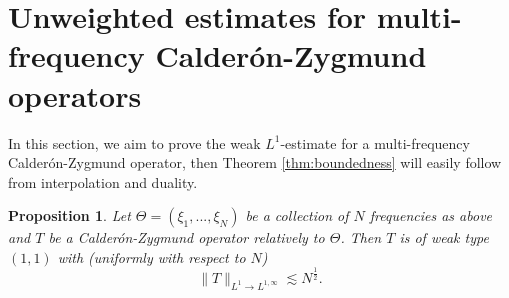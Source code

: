 \documentclass[11pt]{amsart}
\newtheorem{proposition}[theorem]{Proposition}
\theoremstyle{remark}
\begin{document}
\section{Unweighted estimates for multi-frequency Calder\'on-Zygmund operators} \label{sec1}

In this section, we aim to prove the weak $L^1$-estimate for a multi-frequency Calder\'on-Zygmund operator, then Theorem \ref{thm:boundedness} will easily follow from interpolation and duality.

\begin{proposition} \label{prop:bound} Let $\Theta=(\xi_1,...,\xi_N)$ be a collection of $N$ frequencies as above and $T$ be a Calder\'on-Zygmund operator relatively to $\Theta$. Then $T$ is of weak type $(1,1)$ with (uniformly with respect to $N$)
$$ \|T\|_{L^1\to L^{1,\infty}} \lesssim N^{\frac{1}{2}}.$$
\end{proposition}
\end{document}
